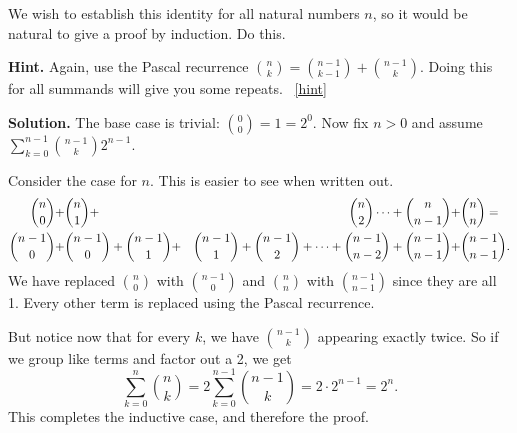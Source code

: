 \documentclass{book}
\begin{document}
\setcounter{project}{77}
\addtocounter{project}{-1}
\begin{activity}[]\label{activity-70}
\hypertarget{p-610}{}%
We wish to establish this identity for all natural numbers \(n\), so it would be natural to give a proof by induction.  Do this.%
\par\smallskip%
\noindent\textbf{Hint.}\hypertarget{hint-33}{}\quad%
\hypertarget{p-611}{}%
Again, use the Pascal recurrence \(\binom{n}{k} = \binom{n-1}{k-1} + \binom{n-1}{k}\).  Doing this for all summands will give you some repeats.%
~\hfill{\tiny\hyperlink{a-77}{[hint]}\hypertarget{q-77}{}}\par\smallskip%
\noindent\textbf{Solution.}\hypertarget{solution-59}{}\quad%
\hypertarget{p-612}{}%
The base case is trivial: \(\binom{0}{0} = 1 = 2^0\).  Now fix \(n \gt 0\) and assume \(\sum_{k=0}^{n-1} \binom{n-1}{k} 2^{n-1}\).%
\par
\hypertarget{p-613}{}%
Consider the case for \(n\).  This is easier to see when written out.%
\begin{align*}
\binom{n}{0} + & \binom{n}{1} + & \binom{n}{2} \cdots + \binom{n}{n-1}  + & \binom{n}{n} = \\
\binom{n-1}{0} + & \binom{n-1}{0} + \binom{n-1}{1} + & \binom{n-1}{1} + \binom{n-1}{2} + \cdots + \binom{n-1}{n-2} + \binom{n-1}{n-1} + & \binom{n-1}{n-1}.
\end{align*}
We have replaced \(\binom{n}{0}\) with \(\binom{n-1}{0}\) and \(\binom{n}{n}\) with \(\binom{n-1}{n-1}\) since they are all 1.  Every other term is replaced using the Pascal recurrence.%
\par
\hypertarget{p-614}{}%
But notice now that for every \(k\), we have \(\binom{n-1}{k}\) appearing exactly twice.  So if we group like terms and factor out a 2, we get%
\begin{equation*}
\sum_{k=0}^n \binom{n}{k} = 2 \sum_{k=0}^{n-1} \binom{n-1}{k} = 2 \cdot 2^{n-1} = 2^n.
\end{equation*}
This completes the inductive case, and therefore the proof.%
\end{activity}
\end{document}
